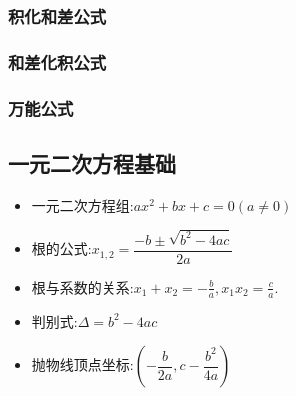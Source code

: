 \documentclass[8pt a4paper, oneside, UTF8]{ctexbook}  %
\begin{document}
\begin{sloppypar}
    \subsubsection{积化和差公式}
    \begin{center}
    \end{center}
    \subsubsection{和差化积公式}
    \begin{center}
    \end{center}
    \subsubsection{万能公式}
    \begin{center}
    \end{center}
    \subsection{一元二次方程基础}
    \begin{itemize}
        \item 一元二次方程组:$a x^2 +bx+c=0(a \neq 0)$
        \item 根的公式:$x_{1,2}=\dfrac{-b\pm\sqrt{b^2-4ac}}{2a}$
        \item 根与系数的关系:$x_{1}+x_{2}=-\frac{b}{a},x_{1}x_{2}=\frac{c}{a}.$
        \item 判别式:$\Delta=b^2-4ac$
        \item 抛物线顶点坐标:$(-\dfrac{b}{2a},c-\dfrac{b^2}{4a})$
    \end{itemize}

\end{sloppypar}
\end{document}
